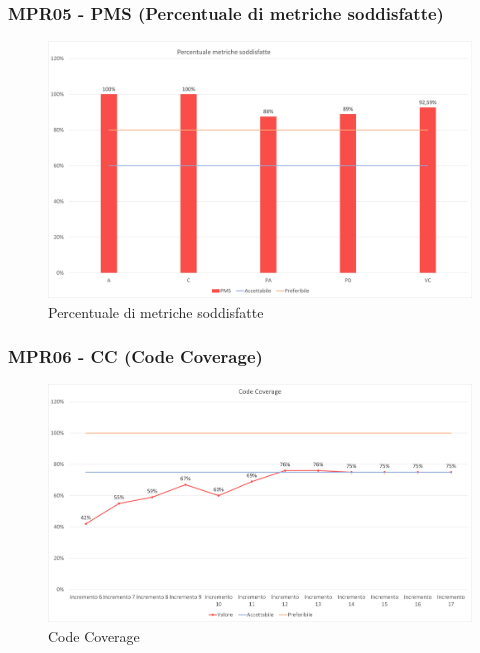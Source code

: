 \subsubsection{MPR05 - PMS (Percentuale di metriche soddisfatte)}
\begin{figure}[!ht]
    \caption{Percentuale di metriche soddisfatte}
    \includegraphics[scale=0.5]{sezioni/immagini/MetricheSoddisfatte.png}
    \centering
\end{figure}
\newpage
\subsubsection{MPR06 - CC (Code Coverage)}
\begin{figure}[!ht]
    \caption{Code Coverage}
    \vspace{10px}
    \includegraphics[scale=0.5]{sezioni/immagini/CodeCoverage.png}
    \centering
\end{figure}
